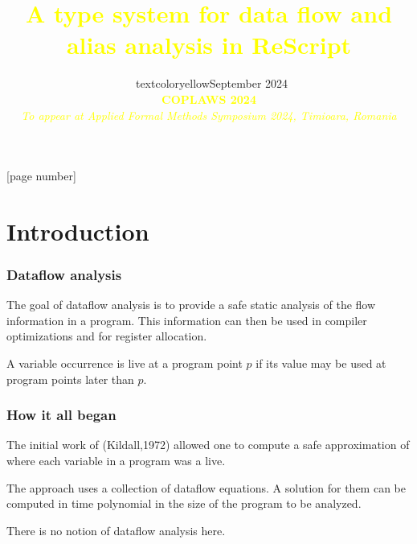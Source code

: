 \documentclass{beamer}
\title{\textcolor{yellow}{\textbf{A type system for data flow and alias analysis in ReScript}}}
\author{\textcolor{yellow}{Nicky Ask Lund \and Hans Hüttel} \\[4mm]
\textcolor{yellow}{Aalborg University \and University of Copenhagen}}
\date{\ textcolor{yellow}{September 2024} \\[4mm]
  \textcolor{yellow}{\large\textbf{COPLAWS 2024}} \\[4mm]
\textcolor{yellow}{\textsl{To appear at Applied Formal Methods
    Symposium 2024, Timi{\textcommabelow{s}}oara, Romania}}}
\begin{document}
{
[page number]
\maketitle
}

\section{Introduction}

\begin{frame}
  \frametitle{Dataflow analysis}

  The goal of dataflow analysis is to provide a safe static analysis
  of the flow information in a program. This information can then be
  used in compiler optimizations and for register allocation.

  A variable occurrence is live at a program point $p$ if its value
  may be used at program points later than $p$.

\end{frame}

\begin{frame}
  \frametitle{How it all began}

The initial work of (Kildall,1972) allowed one to compute a safe approximation
of where each variable in a program was a live.

The approach uses a collection of dataflow equations. A solution for
them can be computed in time polynomial in the size of the program to
be analyzed.

There is no notion of dataflow analysis here.
\end{frame}
\end{document}
